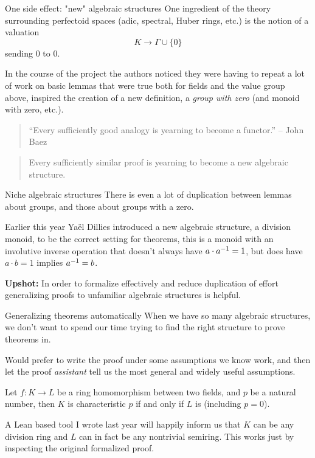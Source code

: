 \begin{frame}{One side effect: "new" algebraic structures}
    One ingredient of the theory surrounding perfectoid spaces (adic, spectral, Huber rings, etc.) is the notion of a valuation
    $$K \to \Gamma \cup \{0\}$$
    sending 0 to 0.

    In the course of the project the authors noticed they were having to repeat a lot of work on basic lemmas that were true both for fields and the value group above, inspired the creation of a new definition, a \emph{group with zero} (and monoid with zero, etc.).

    \begin{quote}
    ``Every sufficiently good analogy is yearning to become a functor.'' -- John Baez
    \end{quote}

    \begin{quote}
    Every sufficiently similar proof is yearning to become a new algebraic structure.
    \end{quote}
\end{frame}

\begin{frame}{Niche algebraic structures}
    There is even a lot of duplication between lemmas about groups, and those about groups with a zero.

    Earlier this year Yaël Dillies introduced a new algebraic structure, a division monoid, to be the correct setting for theorems, this is a monoid with an involutive inverse operation that doesn't always have $a \cdot a^{-1}  = 1$, but does have $a \cdot b = 1$ implies $a ^{-1} = b$.

    \textbf{Upshot:} In order to formalize effectively and reduce duplication of effort generalizing proofs to unfamiliar algebraic structures is helpful.

\end{frame}

\begin{frame}{Generalizing theorems automatically}
    When we have so many algebraic structures, we don't want to spend our time trying to find the right structure to prove theorems in.

    Would prefer to write the proof under some assumptions we know work, and then let the proof \emph{assistant} tell us the most general and widely useful assumptions.
\pause
    \begin{lemma}
        Let $f\colon K\to L$ be a ring homomorphism between two fields, and $p$ be a natural number, then $K$ is characteristic $p$ if and only if $L$ is (including $p= 0$).
    \end{lemma}
\pause
    A Lean based tool I wrote last year will happily inform us that $K$ can be any division ring and $L$ can in fact be any nontrivial semiring.
   This works just by inspecting the original formalized proof.
\end{frame}

